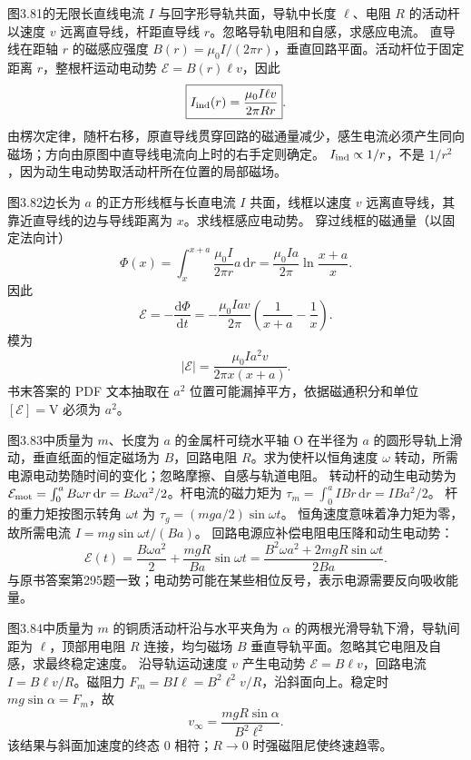图3.81的无限长直线电流 $I$ 与回字形导轨共面，导轨中长度 $\ell$、电阻 $R$ 的活动杆以速度 $v$ 远离直导线，杆距直导线 $r$。忽略导轨电阻和自感，求感应电流。
\exsolution
直导线在距轴 $r$ 的磁感应强度
$B(r)=\mu_0I/(2\pi r)$，垂直回路平面。活动杆位于固定距离 $r$，整根杆运动电动势
$\mathcal E=B(r)\ell v$，因此
\[
\boxed{I_{\rm ind}(r)=\frac{\mu_0I\ell v}{2\pi Rr}}.
\]
由楞次定律，随杆右移，原直导线贯穿回路的磁通量减少，感生电流必须产生同向磁场；方向由原图中直导线电流向上时的右手定则确定。
\excheck $I_{\rm ind}\propto1/r$，不是 $1/r^2$，因为动生电动势取活动杆所在位置的局部磁场。

图3.82边长为 $a$ 的正方形线框与长直电流 $I$ 共面，线框以速度 $v$ 远离直导线，其靠近直导线的边与导线距离为 $x$。求线框感应电动势。
\exsolution
穿过线框的磁通量（以固定法向计）
\[
\Phi(x)=\int_x^{x+a}\frac{\mu_0I}{2\pi r}a\,\mathrm dr
=\frac{\mu_0Ia}{2\pi}\ln\frac{x+a}{x}.
\]
因此
\[
\mathcal E=-\frac{\mathrm d\Phi}{\mathrm dt}
=-\frac{\mu_0Iav}{2\pi}
\left(\frac1{x+a}-\frac1x\right).
\]
模为
\[
\boxed{|\mathcal E|=\frac{\mu_0Ia^2v}{2\pi x(x+a)}}.
\]
\excheck 书末答案的 PDF 文本抽取在 $a^2$ 位置可能漏掉平方，依据磁通积分和单位 $[\mathcal E]=\mathrm V$ 必须为 $a^2$。

图3.83中质量为 $m$、长度为 $a$ 的金属杆可绕水平轴 O 在半径为 $a$ 的圆形导轨上滑动，垂直纸面的恒定磁场为 $B$，回路电阻 $R$。求为使杆以恒角速度 $\omega$ 转动，所需电源电动势随时间的变化；忽略摩擦、自感与轨道电阻。
\exsolution
转动杆的动生电动势为
$\mathcal E_{\rm mot}=\int_0^aB\omega r\,\mathrm dr=B\omega a^2/2$。杆电流的磁力矩为
$\tau_m=\int_0^aIBr\,\mathrm dr=IBa^2/2$。
杆的重力矩按图示转角 $\omega t$ 为
$\tau_g=(mga/2)\sin\omega t$。
恒角速度意味着净力矩为零，故所需电流
$I=mg\sin\omega t/(Ba)$。
回路电源应补偿电阻电压降和动生电动势：
\[
\boxed{\mathcal E(t)=\frac{B\omega a^2}{2}
+\frac{mgR}{Ba}\sin\omega t
=\frac{B^2\omega a^2+2mgR\sin\omega t}{2Ba}}.
\]
\excheck 与原书答案第295题一致；电动势可能在某些相位反号，表示电源需要反向吸收能量。

图3.84中质量为 $m$ 的铜质活动杆沿与水平夹角为 $\alpha$ 的两根光滑导轨下滑，导轨间距为 $\ell$，顶部用电阻 $R$ 连接，均匀磁场 $B$ 垂直导轨平面。忽略其它电阻及自感，求最终稳定速度。
\exsolution
沿导轨运动速度 $v$ 产生电动势
$\mathcal E=B\ell v$，回路电流 $I=B\ell v/R$。磁阻力
$F_m=BI\ell=B^2\ell^2v/R$，沿斜面向上。稳定时
$mg\sin\alpha=F_m$，故
\[
\boxed{v_\infty=\frac{mgR\sin\alpha}{B^2\ell^2}}.
\]
\excheck 该结果与斜面加速度的终态 $0$ 相符；$R\to0$ 时强磁阻尼使终速趋零。

